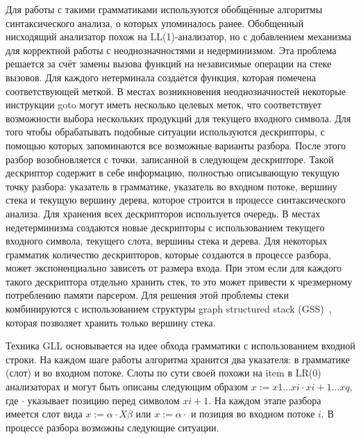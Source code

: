 Для работы с такими грамматиками используются обобщённые алгоритмы синтаксического анализа, о которых упоминалось ранее. Обобщенный нисходящий анализатор похож на LL(1)-анализатор, но с добавлением механизма для корректной работы с неоднозначностями и недерминизмом. Эта проблема решается за счёт замены вызова функций на независимые операции на стеке вызовов. Для каждого нетерминала создаётся функция, которая помечена соответствующей меткой. В местах возникновения неоднозначностей некоторые инструкции goto могут иметь несколько целевых меток, что соответствует возможности выбора нескольких продукций для текущего входного символа. Для того чтобы обрабатывать подобные ситуации используются дескрипторы, с помощью которых запоминаются все возможные варианты разбора. После этого разбор возобновляется с точки, записанной в следующем дескрипторе. Такой дескриптор  содержит в себе информацию, полностью описывающую текущую точку разбора: указатель в грамматике, указатель во входном потоке, вершину стека и текущую вершину дерева, которое строится в процессе синтаксического анализа. Для хранения всех дескрипторов используется очередь. В местах недетерминизма создаются новые дескрипторы с использованием текущего входного символа, текущего слота, вершины стека и дерева. Для некоторых грамматик количество дескрипторов, которые создаются в процессе разбора, может экспоненциально зависеть от размера входа. При этом если для каждого такого дескриптора отдельно хранить стек, то это может привести к чрезмерному потреблению памяти парсером. Для решения этой проблемы стеки комбинируются с использованием структуры graph structured stack (GSS)~\cite{tomita2}, которая позволяет хранить только вершину стека.

Техника GLL основывается на идее обхода грамматики с использованием входной строки. На каждом шаге работы алгоритма хранится два указателя: в грамматике (слот) и во входном потоке. Слоты по сути своей похожи на item в  LR(0) анализаторах и могут быть описаны следующим образом $x := x1 . . . xi \cdot xi+1 . . . xq$, где $\cdot$ указывает позицию перед символом $xi+1$. На каждом этапе разбора имеется слот вида $x := \alpha \cdot Xβ$ или $x := \alpha \cdot$ и позиция во входном потоке $i$. В процессе разбора возможны следующие ситуации.

